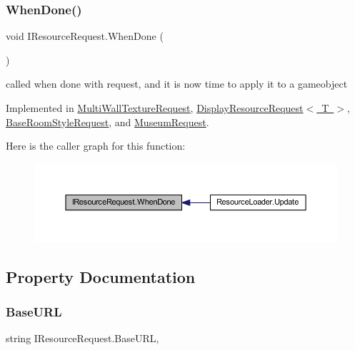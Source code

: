 \subsubsection{\texorpdfstring{When\+Done()}{WhenDone()}}
{\footnotesize\ttfamily void I\+Resource\+Request.\+When\+Done (\begin{DoxyParamCaption}{ }\end{DoxyParamCaption})}



called when done with request, and it is now time to apply it to a gameobject 



Implemented in \mbox{\hyperlink{class_multi_wall_texture_request_a96afd031b54eb8f09658fa1930b7d7f7}{Multi\+Wall\+Texture\+Request}}, \mbox{\hyperlink{class_display_resource_request_a60a8a75088ba20c6c42ebcab8309f1de}{Display\+Resource\+Request$<$ T $>$}}, \mbox{\hyperlink{class_base_room_style_request_ad87356fc17614818e1713857f8901a2a}{Base\+Room\+Style\+Request}}, and \mbox{\hyperlink{class_museum_request_af34f7bf3bc637d500983a44272577a2e}{Museum\+Request}}.

Here is the caller graph for this function\+:
\nopagebreak
\begin{figure}[H]
\begin{center}
\leavevmode
\includegraphics[width=350pt]{interface_i_resource_request_a056e427fa6233602456ccb2d4c405aa0_icgraph}
\end{center}
\end{figure}


\subsection{Property Documentation}
\mbox{\label{interface_i_resource_request_a6da6ac392229cc1a8a09d420ee4357dd}} 
\subsubsection{\texorpdfstring{Base\+U\+RL}{BaseURL}}
{\footnotesize\ttfamily string I\+Resource\+Request.\+Base\+U\+RL\hspace{0.3cm}{\ttfamily [get]}, {\ttfamily [set]}}



